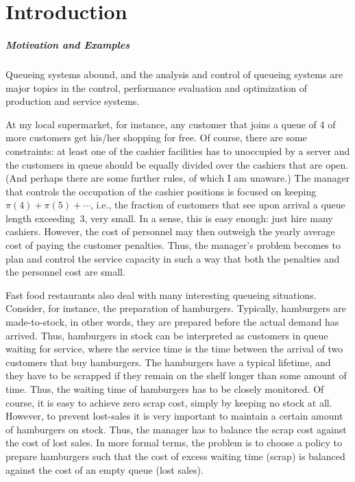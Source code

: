 \chapter*{Introduction}\label{sec:introduction}

\paragraph{Motivation and Examples}
Queueing systems abound, and the analysis and control of queueing
systems are major topics in the control, performance evaluation and
optimization of production and service systems. 


At my local supermarket, for instance, any customer that joins a queue
of 4 of more customers get his/her shopping for free. Of course, there
are some constraints: at least one of the cashier facilities has to
unoccupied by a server and the customers in queue should be equally
divided over the cashiers that are open. (And perhaps there are some
further rules, of which I am unaware.) The manager that controls the
occupation of the cashier positions is focused on keeping
$\pi(4)+\pi(5)+\cdots$, i.e., the fraction of customers that see upon
arrival a queue length exceeding~3, very small. In a sense,
this is easy enough: just hire many cashiers. However, the cost of
personnel may then outweigh the yearly average cost of paying the
customer penalties. Thus, the manager's problem becomes to plan and
control the service capacity  in such a way that both
the penalties and the personnel cost are small.

Fast food restaurants also deal with many interesting queueing
situations. Consider, for instance, the preparation of
hamburgers. Typically, hamburgers are made-to-stock, in other words,
they are prepared before the actual demand has arrived. Thus, hamburgers
in stock can be interpreted as customers in queue waiting for service,
where the service time is the time between the arrival of two
customers that buy hamburgers. The hamburgers have a typical lifetime,
and they have to be scrapped if they remain on the shelf longer than
some amount of time. Thus, the waiting time of hamburgers has to be
closely monitored. Of course, it is easy to achieve zero scrap cost,
simply by keeping no stock at all.  However, to prevent lost-sales it
is very important to maintain a certain amount of hamburgers on
stock. Thus, the manager has to balance the scrap cost against the
cost of lost sales. In more formal terms, the problem is to choose a
policy to prepare hamburgers such that the cost of excess waiting time
(scrap) is balanced against the cost of an empty queue (lost sales).

